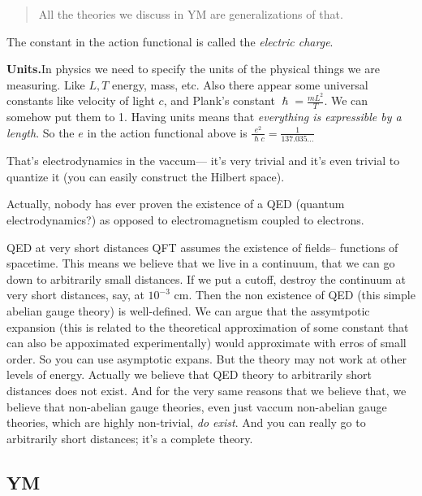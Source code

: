 {\color{3}\begin{quotation}
	All the theories we discuss in YM are generalizations of that.
\end{quotation}}

The constant in the action functional is called the \textit{electric charge}.

{\color{3}\bfseries Units.}\hspace{.5em}In physics we need to specify the units
of the physical things we are measuring. Like $L,T$ energy, mass, etc. Also
there appear some universal constants like velocity of light $c$, and Plank's
constant $\hslash=\frac{mL^2}{T}$. We can somehow put them to 1. Having units
means that \textit{everything is expressible by a length}. So the $e$ in the
action functional above is $\frac{e^2}{\hslash c}=\frac{1}{137.035\ldots}$

That's electrodynamics in the vaccum--- it's very trivial and it's even trivial
to quantize it (you can easily construct the Hilbert space).

Actually, nobody has ever proven the existence of a QED (quantum
electrodynamics?) as opposed to electromagnetism coupled to electrons.

\begin{thing14}{QED at very short distances}\leavevmode
 QFT assumes the existence of fields-- functions of spacetime. This means we
 believe that we live in a continuum, that we can go down to arbitrarily small
 distances. If we put a cutoff, destroy the continuum at very short distances,
 say, at $10^{-3}$ cm. Then the non existence of QED (this simple abelian gauge
 theory) is well-defined. We can argue that the assymtpotic expansion (this is
 related to the theoretical approximation of some constant that can also be
 appoximated experimentally) would approximate with erros of small order. So you
 can use asymptotic expans. But the theory may not work at other levels of
 energy. Actually we believe that QED theory to arbitrarily short distances does
 not exist. And for the very same reasons that we believe that, we believe that
 non-abelian gauge theories, even just vaccum non-abelian gauge theories, which
 are highly non-trivial, \textit{do exist}. And you can really go to arbitrarily
 short distances; it's a complete theory.
\end{thing14}

\subsection{YM}

